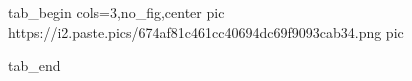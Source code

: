  
 
 
 
 
\zzSecCmtScr


\ifcmt
  tab_begin cols=3,no_fig,center
     pic https://i2.paste.pics/674af81c461cc40694dc69f9093cab34.png
		 pic 

  tab_end
\fi
